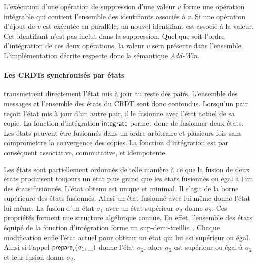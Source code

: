 
L'exécution d'une opération de suppression d'une valeur $v$ forme une opération intégrable qui contient l'ensemble des identifiants associés à $v$.
Si une opération d'ajout de $v$ est exécutée en parallèle, un nouvel identifiant est associé à la valeur.
Cet identifiant n'est pas inclut dans la suppression.
Quel que soit l'ordre d'intégration de ces deux opérations, la valeur $v$ sera présente dans l'ensemble.
L'implémentation décrite respecte donc la sémantique \emph{Add-Win}.


\paragraph{Les \acp{CRDT} synchronisés par états} transmettent directement l'état mis à jour au reste des pairs.
L'ensemble des messages et l'ensemble des états du \ac{CRDT} sont donc confondus.
Lorsqu'un pair reçoit l'état mis à jour d'un autre pair, il le fusionne avec l'état actuel de sa copie.
La fonction d'intégration $\operatorname{\mathsf{integrate}}$ permet donc de fusionner deux états.
Les états peuvent être fusionnés dans un ordre arbitraire et plusieurs fois sans compromettre la convergence des copies.
La fonction d'intégration est par conséquent associative, commutative, et idempotente.

Les états sont partiellement ordonnés de telle manière à ce que la fusion de deux états produisent toujours un état plus grand que les états fusionnés ou égal à l'un des états fusionnés.
L'état obtenu est unique et minimal.
Il s'agit de la borne supérieure des états fusionnés.
AInsi un état fusionné avec lui même donne l'état lui-même.
La fusion d'un état $\sigma_1$ avec un état supérieur $\sigma_2$ donne $\sigma_2$.
Ces propriétés forment une structure algébrique connue.
En effet, l'ensemble des états équipé de la fonction d'intégration forme un sup-demi-treillis~\autocite{davey2002lattice}.
Chaque modification enfle l'état actuel pour obtenir un état qui lui est supérieur ou égal.
Ainsi si l'appel $\operatorname{\mathsf{prepare}}_i(\sigma_1, \_)$ donne l'état $\sigma_2$, alors $\sigma_2$ est supérieur ou égal à $\sigma_2$ et leur fusion donne $\sigma_2$.

